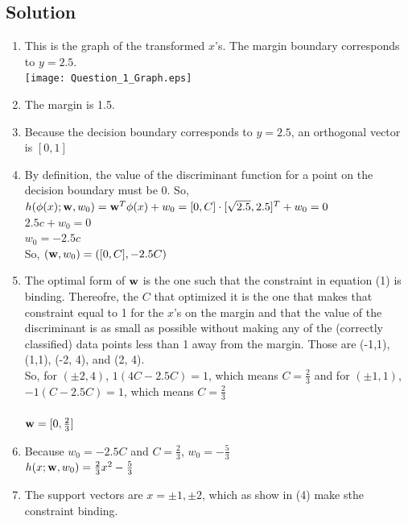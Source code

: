 \documentclass[submit]{harvardml}
\begin{document}
\subsection*{Solution}
\begin{enumerate}
	\item  This is the graph of the transformed $x$'s.  The margin boundary corresponds to $y = 2.5$.  \\ \texttt{[image: Question\_1\_Graph.eps]}
	
	\item The margin is 1.5. \\
	
	\item Because the decision boundary corresponds to $y = 2.5$, an orthogonal vector is $[0,1]$ \\
	
	\item By definition, the value of the discriminant function for a point on the decision boundary must be 0.  So, $h(\phi(x); \mathbf{w}, w_0) = \mathbf{w}^T\phi(x) + w_0 = [0, C] \cdot [\sqrt{2.5}, 2.5]^T + w_0 = 0$ \\
	$2.5c + w_0 = 0$ \\
	$w_0 = -2.5c$ \\
	So, $(\mathbf{w}, w_0) = ([0, C], -2.5C)$ \\
	
	\item  The optimal form of $\mathbf{w}$ is the one such that the constraint in equation (1) is binding.  Thereofre, the $C$ that optimized it is the one that makes that constraint equal to 1 for the $x$'s on the margin and that the value of the discriminant is as small as possible without making any of the (correctly classified) data points less than 1 away from the margin.  Those are (-1,1), (1,1), (-2, 4), and (2, 4). \\
	So, for $(\pm 2, 4)$,  $1(4C - 2.5C) = 1$, which means $C = \frac{2}{3}$ and for $(\pm 1, 1)$, $-1(C - 2.5C) = 1$, which means $C = \frac{2}{3}$ \\\\
	
	\noindent $\mathbf{w} = [0, \frac{2}{3}]$
	
	\item Because $w_0 = -2.5C$ and $C = \frac{2}{3}$, $w_0 = -\frac{5}{3}$ \\
	$h(x; \mathbf{w}, w_0) = \frac{2}{3}x^2 - \frac{5}{3}$ 
	
	\item The support vectors are $x = \pm 1, \pm 2$, which as show in (4) make sthe constraint binding.  
	
	
\end{enumerate}
\end{document}
